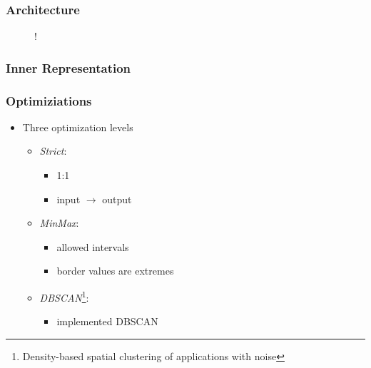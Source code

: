\documentclass[10pt,xcolor=pdflatex]{beamer}
\begin{document}
\begin{frame}\frametitle{Architecture}
  \begin{figure}[h]
  \centering
  \resizebox {\textwidth} {!} {
    
  }
  \label{fig:tikz:architecture}
\end{figure}
\end{frame}

\begin{frame}\frametitle{Inner Representation}
  \begin{figure}[h]
  \centering
  \label{fig:tikz:IDStree}
\end{figure}
\end{frame}

\begin{frame}\frametitle{Optimiziations}

  \begin{itemize}
    \item Three optimization levels
     \begin{itemize}
	    \item \emph{Strict}:
	    \begin{itemize}
	      \item 1:1
	      \item input $\rightarrow$ output
	    \end{itemize}
	    \item \emph{MinMax}:
	    \begin{itemize}
	      \item allowed intervals
	      \item border values are extremes
	    \end{itemize}
	    \item \emph{DBSCAN}\footnote{Density-based spatial clustering of applications with noise}:
	    \begin{itemize}
	      \item implemented DBSCAN\cite{Mahesh_Kumar2016, Schubert:2017:DRR:3129336.3068335}
	    \end{itemize}
	  \end{itemize}
  \end{itemize}

 
\end{frame}
\end{document}
